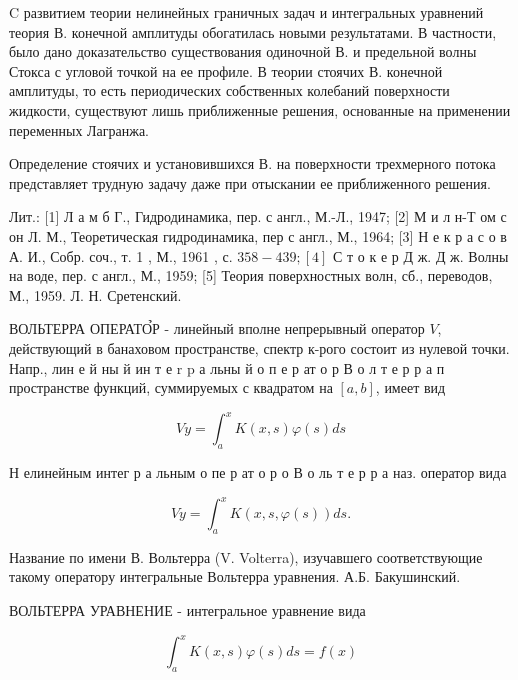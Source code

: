 \documentclass[10pt]{article}
\begin{document}
C развитием теории нелинейных граничных задач и интегральных уравнений теория В. конечной амплитуды обогатилась новыми результатами. В частности, было дано доказательство существования одиночной В. и предельной волны Стокса с угловой точкой на ее профиле. В теории стоячих В. конечной амплитуды, то есть периодических собственных колебаний поверхности жидкости, существуют лишь приближенные решения, основанные на применении переменных Лагранжа.



Определение стоячих и установившихся В. на поверхности трехмерного потока представляет трудную задачу даже при отыскании ее приближенного решения.



Лит.: [1] Л а м б Г., Гидродинамика, пер. с англ., М.-Л., 1947; [2] М и л н-Т ом с он Л. М., Теоретическая гидродинамика, пер с англ., М., 1964; [3] Н е к р а с о в А. И., Собр. соч., т. 1 , М., 1961 , с. $358-439 ;[4]$ С т о к е р Д ж. Д ж. Волны на воде, пер. с англ., М., 1959; [5] Теория поверхностных волн, сб., переводов, М., 1959. Л. Н. Сретенский.



ВОЛЬТЕРРА ОПЕРАТО̉Р - линейный вполне непрерывный оператор $V$, действующий в банаховом пространстве, спектр к-рого состоит из нулевой точки. Напр., лин е й ны й ин т е r p а льны й о п е р ат о р В о л т е р р а п пространстве функций, суммируемых с квадратом на $[a, b]$, имеет вид



\[

V y=\int_{a}^{x} K(x, s) \varphi(s) d s

\]



Н елинейным интег р а льным о пе р ат о р о В о ль т е р р а наз. оператор вида



\[

V y=\int_{a}^{x} K(x, s, \varphi(s)) d s .

\]



Название по имени В. Вольтерра (V. Volterra), изучавшего соответствующие такому оператору интегральные Вольтерра уравнения. А.Б. Бакушинский.



ВОЛЬТЕРРА УРАВНЕНИЕ - интегральное уравнение вида



\[

\int_{a}^{x} K(x, s) \varphi(s) d s=f(x)

\]
\end{document}
